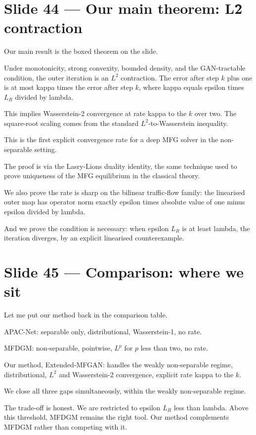 \documentclass[11pt]{article}
\begin{document}
\section*{Slide 44 --- Our main theorem: L\^2 contraction}

Our main result is the boxed theorem on the slide.

Under monotonicity, strong convexity, bounded density, and the GAN-tractable
condition, the outer iteration is an $L^2$ contraction. The error after
step $k$ plus one is at most kappa times the error after step $k$, where
kappa equals epsilon times $L_R$ divided by lambda.

This implies Wasserstein-2 convergence at rate kappa to the $k$ over two.
The square-root scaling comes from the standard $L^2$-to-Wasserstein
inequality.

This is the first explicit convergence rate for a deep MFG solver in the
non-separable setting.

The proof is via the Lasry-Lions duality identity, the same technique used
to prove uniqueness of the MFG equilibrium in the classical theory.

We also prove the rate is sharp on the bilinear traffic-flow family: the
linearised outer map has operator norm exactly epsilon times absolute value
of one minus epsilon divided by lambda.

And we prove the condition is necessary: when epsilon $L_R$ is at least
lambda, the iteration diverges, by an explicit linearised counterexample.

\section*{Slide 45 --- Comparison: where we sit}

Let me put our method back in the comparison table.

APAC-Net: separable only, distributional, Wasserstein-1, no rate.

MFDGM: non-separable, pointwise, $L^p$ for $p$ less than two, no rate.

Our method, Extended-MFGAN: handles the weakly non-separable regime,
distributional, $L^2$ and Wasserstein-2 convergence, explicit rate kappa
to the $k$.

We close all three gaps simultaneously, within the weakly non-separable
regime.

The trade-off is honest. We are restricted to epsilon $L_R$ less than
lambda. Above this threshold, MFDGM remains the right tool. Our method
complements MFDGM rather than competing with it.
\end{document}
